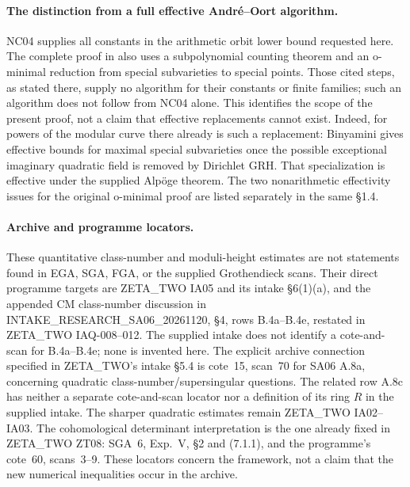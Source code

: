 \paragraph{The distinction from a full effective Andr\'e--Oort algorithm.}
NC04 supplies all constants in the arithmetic orbit lower bound requested
here.  The complete proof in \cite[\S6.3, Theorem~6.1, and \S6.5,
p.~388]{NC-Tsimerman2018} also uses a subpolynomial counting theorem and
an o-minimal reduction from special subvarieties to special points.
Those cited steps, as stated there, supply no algorithm for their
constants or finite families; such an algorithm does not follow from
NC04 alone.  This identifies the scope of the present proof, not a
claim that effective replacements cannot exist.  Indeed, for powers
of the modular curve there already is such a replacement:
Binyamini \cite[\S1.2, Theorem~1, preprint p.~2; \S1.4, pp.~3--4]
{NC-Binyamini2020} gives effective bounds for maximal special
subvarieties once the possible exceptional imaginary quadratic field
is removed by Dirichlet GRH.  That specialization is effective under
the supplied Alp\"oge theorem.  The two nonarithmetic effectivity
issues for the original o-minimal proof are listed separately in the
same \S1.4.

\paragraph{Archive and programme locators.}
These quantitative class-number and moduli-height estimates are not
statements found in EGA, SGA, FGA, or the supplied Grothendieck scans.
Their direct programme targets are ZETA\_TWO IA05 and its intake
\S6(1)(a), and the appended CM class-number discussion in
INTAKE\_RESEARCH\_SA06\_20261120, \S4, rows B.4a--B.4e, restated
in ZETA\_TWO IAQ-008--012.  The supplied intake does not identify a
cote-and-scan for B.4a--B.4e; none is invented here.  The explicit
archive connection specified in ZETA\_TWO's intake \S5.4 is
cote~15, scan~70 for SA06 A.8a, concerning quadratic
class-number/supersingular questions.  The related row A.8c has
neither a separate cote-and-scan locator nor a definition of its
ring $R$ in the supplied intake.  The sharper quadratic estimates
remain ZETA\_TWO IA02--IA03.
The cohomological determinant interpretation is the one already fixed
in ZETA\_TWO ZT08: SGA~6, Exp.~V, \S2 and (7.1.1), and the programme's
cote~60, scans~3--9.  These locators concern the framework, not a
claim that the new numerical inequalities occur in the archive.
